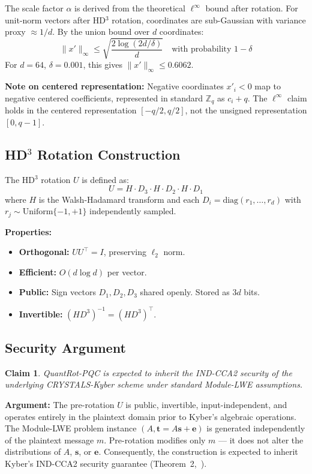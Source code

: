 \documentclass[preprint,a4paper]{article}
\newtheorem{claim}{Claim}
\begin{document}
The scale factor $\alpha$ is derived from the theoretical
$\ell^\infty$ bound after rotation. For unit-norm vectors
after HD$^3$ rotation, coordinates are sub-Gaussian with
variance proxy $\approx 1/d$. By the union bound over
$d$ coordinates:
\[
    \|x'\|_\infty \leq
    \sqrt{\frac{2\log(2d/\delta)}{d}}
    \quad \text{with probability } 1 - \delta
\]
For $d = 64$, $\delta = 0.001$, this gives
$\|x'\|_\infty \leq 0.6062$.

\textbf{Note on centered representation:}
Negative coordinates $x'_i < 0$ map to negative centered
coefficients, represented in standard $\mathbb{Z}_q$ as
$c_i + q$. The $\ell^\infty$ claim holds in the centered
representation $[-q/2, q/2]$, not the unsigned
representation $[0, q-1]$.

\subsection{HD$^3$ Rotation Construction}
\label{sec:hd3}

The HD$^3$ rotation $U$ is defined as:
\[
    U = H \cdot D_3 \cdot H \cdot D_2 \cdot H \cdot D_1
\]
where $H$ is the Walsh-Hadamard transform and each
$D_i = \text{diag}(r_1, \ldots, r_d)$ with
$r_j \sim \text{Uniform}\{-1, +1\}$ independently sampled.

\textbf{Properties:}
\begin{itemize}
    \item \textbf{Orthogonal:} $UU^\top = I$,
          preserving $\ell_2$ norm.
    \item \textbf{Efficient:} $O(d \log d)$ per vector.
    \item \textbf{Public:} Sign vectors $D_1, D_2, D_3$
          shared openly. Stored as $3d$ bits.
    \item \textbf{Invertible:}
          $(HD^3)^{-1} = (HD^3)^\top$.
\end{itemize}

\subsection{Security Argument}
\label{sec:security}

\begin{claim}
QuantRot-PQC is expected to inherit the IND-CCA2 security
of the underlying CRYSTALS-Kyber scheme under standard
Module-LWE assumptions.
\end{claim}

\textbf{Argument:}
The pre-rotation $U$ is public, invertible,
input-independent, and operates entirely in the plaintext
domain prior to Kyber's algebraic operations.
The Module-LWE problem instance
$(A, \mathbf{t} = A\mathbf{s} + \mathbf{e})$ is generated
independently of the plaintext message $m$.
Pre-rotation modifies only $m$ --- it does not alter
the distributions of $A$, $\mathbf{s}$, or $\mathbf{e}$.
Consequently, the construction is expected to inherit
Kyber's IND-CCA2 security guarantee
(Theorem~2,~\cite{kyber2021}).
\end{document}
